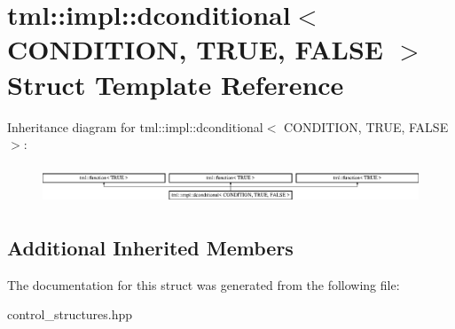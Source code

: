 \hypertarget{structtml_1_1impl_1_1dconditional}{\section{tml\+:\+:impl\+:\+:dconditional$<$ C\+O\+N\+D\+I\+T\+I\+O\+N, T\+R\+U\+E, F\+A\+L\+S\+E $>$ Struct Template Reference}
\label{structtml_1_1impl_1_1dconditional}
}
Inheritance diagram for tml\+:\+:impl\+:\+:dconditional$<$ C\+O\+N\+D\+I\+T\+I\+O\+N, T\+R\+U\+E, F\+A\+L\+S\+E $>$\+:\begin{figure}[H]
\begin{center}
\leavevmode
\includegraphics[height=1.170324cm]{structtml_1_1impl_1_1dconditional}
\end{center}
\end{figure}
\subsection*{Additional Inherited Members}


The documentation for this struct was generated from the following file\+:\begin{DoxyCompactItemize}
\item 
control\+\_\+structures.\+hpp\end{DoxyCompactItemize}
